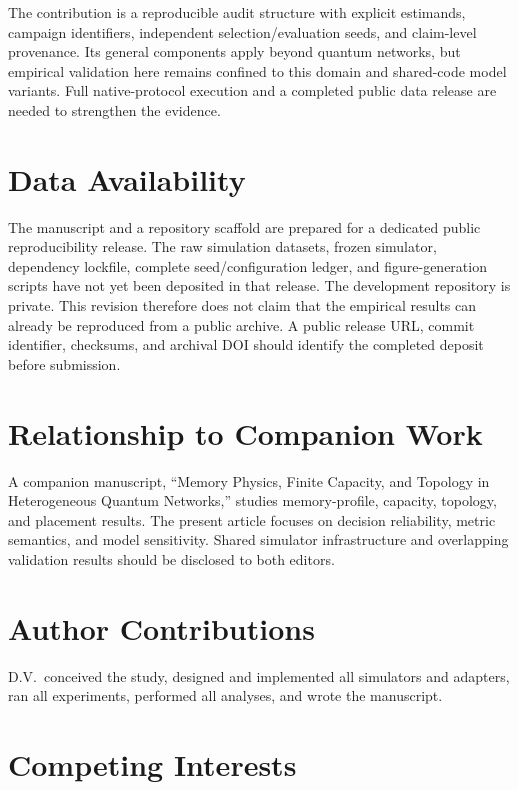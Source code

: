 \documentclass[aps,prapplied,reprint,superscriptaddress]{revtex4-2}
\begin{document}
The contribution is a reproducible audit structure with explicit estimands, campaign identifiers, independent selection/evaluation seeds, and claim-level provenance. Its general components apply beyond quantum networks, but empirical validation here remains confined to this domain and shared-code model variants. Full native-protocol execution and a completed public data release are needed to strengthen the evidence.

\section*{Data Availability}

The manuscript and a repository scaffold are prepared for a dedicated public reproducibility release. The raw simulation datasets, frozen simulator, dependency lockfile, complete seed/configuration ledger, and figure-generation scripts have not yet been deposited in that release. The development repository is private. This revision therefore does not claim that the empirical results can already be reproduced from a public archive. A public release URL, commit identifier, checksums, and archival DOI should identify the completed deposit before submission.

\section*{Relationship to Companion Work}

A companion manuscript, ``Memory Physics, Finite Capacity, and Topology in Heterogeneous Quantum Networks,'' studies memory-profile, capacity, topology, and placement results. The present article focuses on decision reliability, metric semantics, and model sensitivity. Shared simulator infrastructure and overlapping validation results should be disclosed to both editors.

\section*{Author Contributions}

D.V.\ conceived the study, designed and implemented all simulators and adapters, ran all experiments, performed all analyses, and wrote the manuscript.

\section*{Competing Interests}
\end{document}
